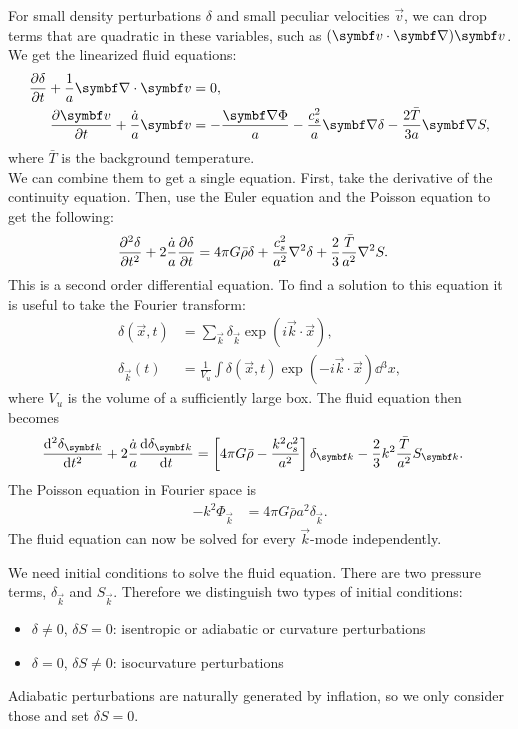 For small density perturbations $\delta$ and small peculiar velocities $\vec{v}$, we can drop terms that are quadratic in these variables, such as $(\vec{v} \cdot \Grad) \vec{v}$. We get the linearized fluid equations:
\begin{align*}
	\pdv{\delta}{t} + \frac{1}{a} \Div \vec{v} &= 0,\\
	\pdv{\vec{v}}{t} + \frac{\dot{a}}{a} \vec{v} &= - \frac{\Grad \Phi}{a} - \frac{c_s^2}{a} \Grad \delta - \frac{2 \bar{T}}{3a} \Grad S,
\end{align*}
where $\bar{T}$ is the background temperature. \\
We can combine them to get a single equation. First, take the derivative of the continuity equation. Then, use the Euler equation and the Poisson equation to get the following:
\begin{align*}
	\pdv[2]{\delta}{t} + 2 \frac{\dot{a}}{a} \pdv{\delta}{t} &= 4 \pi G \bar{\rho} \delta + \frac{c_s^2}{a^2} \Lap \delta + \frac{2}{3} \frac{\bar{T}}{a^2} \Lap S.
\end{align*}
This is a second order differential equation. To find a solution to this equation it is useful to take the Fourier transform:
\begin{align*}
	\delta(\vec{x},t) &= \sum_{\vec{k}} \delta_{\vec{k}} \exp(i \vec{k} \cdot \vec{x}),\\
	\delta_{\vec{k}}(t) &= \frac{1}{V_u} \int \delta(\vec{x},t) \exp(-i \vec{k} \cdot \vec{x}) \dd{^3x},
\end{align*}
where $V_u$ is the volume of a sufficiently large box. The fluid equation then becomes
\begin{align*}
	\dv[2]{\delta_{\vec{k}}}{t} + 2 \frac{\dot{a}}{a} \dv{\delta_{\vec{k}}}{t}
	&= \left[4 \pi G \bar{\rho} - \frac{k^2 c_s^2}{a^2}\right] \delta_{\vec{k}} - \frac{2}{3} k^2 \frac{\bar{T}}{a^2} S_{\vec{k}}.
\end{align*}
The Poisson equation in Fourier space is
\begin{align*}
	- k^2 \Phi_{\vec{k}} &= 4 \pi G \bar{\rho} a^2 \delta_{\vec{k}}.
\end{align*}
The fluid equation can now be solved for every $\vec{k}$-mode independently.


We need initial conditions to solve the fluid equation. There are two pressure terms, $\delta_{\vec{k}}$ and $S_{\vec{k}}$. Therefore we distinguish two types of initial conditions:
\begin{itemize}
	\item $\delta \neq 0$, $\delta S = 0$: isentropic or adiabatic or curvature perturbations
	\item $\delta = 0$, $\delta S \neq 0$: isocurvature perturbations
\end{itemize}
Adiabatic perturbations are naturally generated by inflation, so we only consider those and set $\delta S = 0$.

